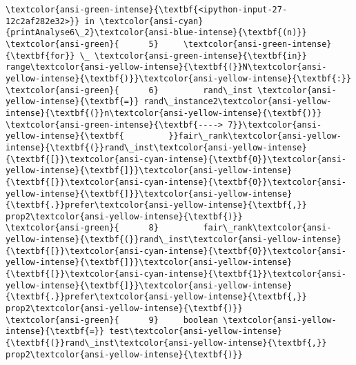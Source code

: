 \documentclass[11pt]{article}
\begin{document}
\begin{Verbatim}[commandchars=\\\{\}, frame=single, framerule=2mm, rulecolor=\color{outerrorbackground}]
\textcolor{ansi-green-intense}{\textbf{<ipython-input-27-12c2af282e32>}} in \textcolor{ansi-cyan}{printAnalyse6\_2}\textcolor{ansi-blue-intense}{\textbf{(n)}}
\textcolor{ansi-green}{      5}     \textcolor{ansi-green-intense}{\textbf{for}} \_ \textcolor{ansi-green-intense}{\textbf{in}} range\textcolor{ansi-yellow-intense}{\textbf{(}}N\textcolor{ansi-yellow-intense}{\textbf{)}}\textcolor{ansi-yellow-intense}{\textbf{:}}
\textcolor{ansi-green}{      6}         rand\_inst \textcolor{ansi-yellow-intense}{\textbf{=}} rand\_instance2\textcolor{ansi-yellow-intense}{\textbf{(}}n\textcolor{ansi-yellow-intense}{\textbf{)}}
\textcolor{ansi-green-intense}{\textbf{----> 7}}\textcolor{ansi-yellow-intense}{\textbf{         }}fair\_rank\textcolor{ansi-yellow-intense}{\textbf{(}}rand\_inst\textcolor{ansi-yellow-intense}{\textbf{[}}\textcolor{ansi-cyan-intense}{\textbf{0}}\textcolor{ansi-yellow-intense}{\textbf{]}}\textcolor{ansi-yellow-intense}{\textbf{[}}\textcolor{ansi-cyan-intense}{\textbf{0}}\textcolor{ansi-yellow-intense}{\textbf{]}}\textcolor{ansi-yellow-intense}{\textbf{.}}prefer\textcolor{ansi-yellow-intense}{\textbf{,}} prop2\textcolor{ansi-yellow-intense}{\textbf{)}}
\textcolor{ansi-green}{      8}         fair\_rank\textcolor{ansi-yellow-intense}{\textbf{(}}rand\_inst\textcolor{ansi-yellow-intense}{\textbf{[}}\textcolor{ansi-cyan-intense}{\textbf{0}}\textcolor{ansi-yellow-intense}{\textbf{]}}\textcolor{ansi-yellow-intense}{\textbf{[}}\textcolor{ansi-cyan-intense}{\textbf{1}}\textcolor{ansi-yellow-intense}{\textbf{]}}\textcolor{ansi-yellow-intense}{\textbf{.}}prefer\textcolor{ansi-yellow-intense}{\textbf{,}} prop2\textcolor{ansi-yellow-intense}{\textbf{)}}
\textcolor{ansi-green}{      9}     boolean \textcolor{ansi-yellow-intense}{\textbf{=}} test\textcolor{ansi-yellow-intense}{\textbf{(}}rand\_inst\textcolor{ansi-yellow-intense}{\textbf{,}} prop2\textcolor{ansi-yellow-intense}{\textbf{)}}


\end{Verbatim}
\end{document}
